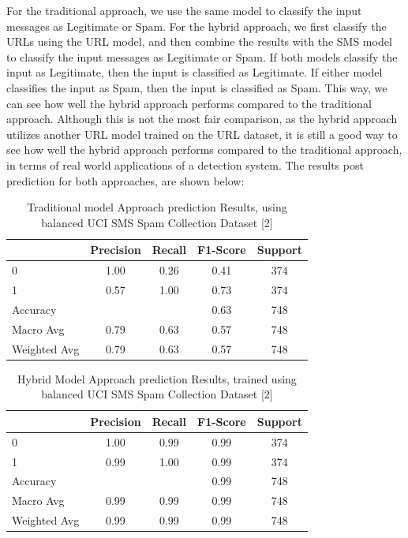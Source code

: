 \documentclass{article}
\begin{document}
\newpage

\noindent
For the traditional approach, we use the same model to classify the input messages as Legitimate or Spam. For the hybrid approach, we first classify the URLs using the URL model, and then combine the results with the SMS model to classify the input messages as Legitimate or Spam. If both models classify the input as Legitimate, then the input is classified as Legitimate. If either model classifies the input as Spam, then the input is classified as Spam. This way, we can see how well the hybrid approach performs compared to the traditional approach. Although this is not the most fair comparison, as the hybrid approach utilizes another URL model trained on the URL dataset, it is still a good way to see how well the hybrid approach performs compared to the traditional approach, in terms of real world applications of a detection system. The results post prediction for both approaches, are shown below:


\begin{table}[htbp]
    \centering
    \caption{Traditional model Approach prediction Results, using balanced UCI SMS Spam Collection Dataset [2]}
    \begin{tabular}{l c c c c}
    \toprule
     & Precision & Recall & F1-Score & Support \\
    \midrule
    0 & 1.00 & 0.26 & 0.41 & 374 \\
    1 & 0.57 & 1.00 & 0.73 & 374 \\
    \midrule
    Accuracy & & & 0.63 & 748 \\
    Macro Avg & 0.79 & 0.63 & 0.57 & 748 \\
    Weighted Avg & 0.79 & 0.63 & 0.57 & 748 \\
    \bottomrule
    \end{tabular}
    \label{tab:classification_report_4}
\end{table}

\begin{table}[htbp]
    \centering
    \caption{Hybrid Model Approach prediction Results, trained using balanced UCI SMS Spam Collection Dataset [2]}
    \begin{tabular}{l c c c c}
    \toprule
     & Precision & Recall & F1-Score & Support \\
    \midrule
    0 & 1.00 & 0.99 & 0.99 & 374 \\
    1 & 0.99 & 1.00 & 0.99 & 374 \\
    \midrule
    Accuracy & & & 0.99 & 748 \\
    Macro Avg & 0.99 & 0.99 & 0.99 & 748 \\
    Weighted Avg & 0.99 & 0.99 & 0.99 & 748 \\
    \bottomrule
    \end{tabular}
    \label{tab:classification_report_5}
\end{table}
\end{document}
